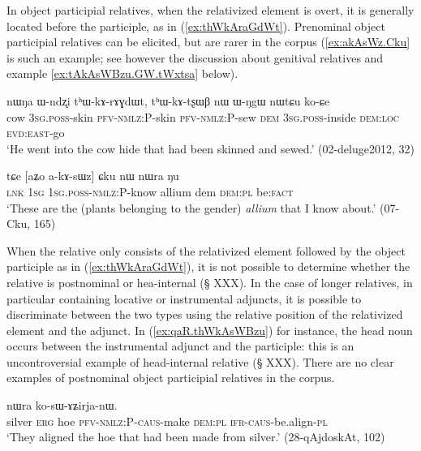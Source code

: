 In object participial relatives, when the relativized element is overt, it is generally located before the participle, as in (\ref{ex:thWkAraGdWt}). Prenominal object participial relatives can be elicited, but are rarer in the corpus (\ref{ex:akAsWz.Cku} is such an example; see however the discussion about genitival relatives and example \ref{ex:tAkAsWBzu.GW.tWxtsa} below).

\begin{exe}
\ex \label{ex:thWkAraGdWt}
\gll  nɯŋa ɯ-ndʐi tʰɯ-kɤ-rɤɣdɯt, tʰɯ-kɤ-tʂɯβ nɯ ɯ-ŋgɯ nɯtɕu ko-ɕe  \\
cow \textsc{3sg.poss}-skin \textsc{pfv-nmlz:P}-skin \textsc{pfv-nmlz:P}-sew \textsc{dem} \textsc{3sg.poss}-inside \textsc{dem}:\textsc{loc} \textsc{evd:east}-go \\
\glt  `He went into the cow hide that had been skinned and sewed.'    (02-deluge2012, 32)
\end{exe}  

\begin{exe}
\ex \label{ex:akAsWz.Cku}
\gll   tɕe [aʑo a-kɤ-sɯz] ɕku nɯ nɯra ŋu \\
\textsc{lnk} \textsc{1sg} \textsc{1sg}.\textsc{poss}-\textsc{nmlz}:P-know allium dem \textsc{dem}:\textsc{pl} be:\textsc{fact} \\
\glt `These are the (plants belonging to the gender) \textit{allium} that I know about.' (07-Cku, 165)
\end{exe}  

When the relative only consists of the relativized element followed by the object participle as in (\ref{ex:thWkAraGdWt}), it is not possible to determine whether the relative is postnominal or hea-internal (§ XXX). In the case of longer relatives, in particular containing locative or instrumental adjuncts, it is possible to discriminate between the two types using the relative position of the relativized element and the adjunct. In (\ref{ex:qaR.thWkAsWBzu}) for instance, the head noun  occurs between the instrumental adjunct   and the participle: this is an uncontroversial example of head-internal relative (§ XXX). There are no clear examples of postnominal object participial relatives in the corpus.

\begin{exe}
\ex \label{ex:qaR.thWkAsWBzu}
 nɯra ko-sɯ-ɤʑirja-nɯ. \\
silver \textsc{erg} hoe \textsc{pfv}-\textsc{nmlz}:P-\textsc{caus}-make \textsc{dem}:\textsc{pl} \textsc{ifr}-\textsc{caus}-be.align-\textsc{pl} \\
\glt `They aligned the hoe that had been made from silver.' (28-qAjdoskAt, 102)
\end{exe}  


